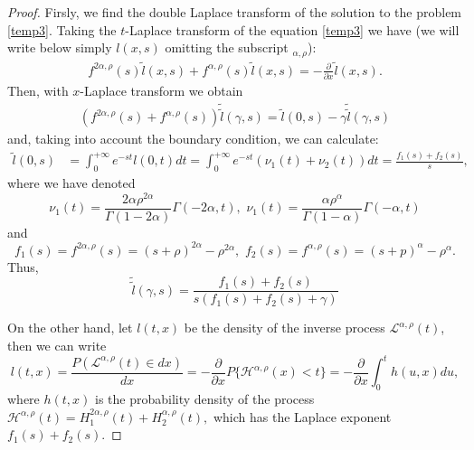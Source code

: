 \documentclass[12pt]{article}
\theoremstyle{definition}
\theoremstyle{plain}
\begin{document}
	\begin{proof} Firsly, we find the double Laplace transform of the solution  to the problem \eqref{temp3}.
		Taking the $t$-Laplace transform of the equation \eqref{temp3} we have (we  will write below simply ${l}(x,s)$ omitting the subscript $_{\alpha,\rho}$):
		\begin{align*}
			f^{2\alpha, \rho}(s) \tilde{l}(x,s) + f^{\alpha, \rho}(s) \tilde{l}(x,s) = -\frac{\partial}{\partial x} \tilde{l}(x,s).
		\end{align*}
Then, with $x$-Laplace transform we obtain
		\begin{align*}
			(f^{2\alpha, \rho}(s) + f^{\alpha, \rho}(s)) \tilde{\tilde{l}}(\gamma, s) = \tilde{l}(0,s) - \gamma \tilde{\tilde{l}}(\gamma,s)
		\end{align*}
and, taking into account the boundary condition, we can calculate:
		\begin{align*}
			\tilde{l}(0,s) &= \int_0^{+\infty} e^{-st} l(0,t) dt = \int_0^{+\infty} e^{-st} (\nu_1(t) + \nu_2(t)) dt = \frac{f_1(s) + f_2(s)}{s},			
		\end{align*}
where we have denoted
$$\nu_1(t)=\frac{2\alpha \rho^{2\alpha}}{\Gamma(1-2\alpha)} \Gamma(-2\alpha, t), \,\, \nu_1(t)= \frac{\alpha \rho^\alpha}{\Gamma(1-\alpha)} \Gamma(-\alpha, t)$$	
and
$$f_1(s) = f^{2\alpha, \rho}(s) = (s+\rho)^{2\alpha} - \rho^{2\alpha}, \,\,
			f_2(s) = f^{\alpha, \rho}(s) = (s+p)^\alpha - \rho^\alpha.$$
Thus,				
		\begin{equation}\label{temp4}
			\tilde{\tilde{l}}(\gamma, s) = \frac{f_1(s) + f_2(s)}{s(f_1(s) + f_2(s) + \gamma)}
		\end{equation}
		
				On the other hand, let $l(t,x)$ be the density of the inverse process $\mathcal{L}^{\alpha, \rho}(t)$, then we can write
		\begin{equation}\label{(5)}
			l(t,x) = \frac{P(\mathcal{L}^{\alpha, \rho}(t) \in dx)}{dx} = -\frac{\partial}{\partial x} P \{ \mathcal{H}^{\alpha, \rho}(x) < t \} = -\frac{\partial}{\partial x} \int_0^t h(u,x) du,
		\end{equation}
where $h(t,x)$ is the probability density of the 	process	$\mathcal{H}^{\alpha, \rho}(t)=H_1^{2\alpha, \rho}(t) +  H_2^{\alpha,\rho}(t),$ which has the Laplace exponent $f_1(s) + f_2(s)$.


\end{proof}
\end{document}
